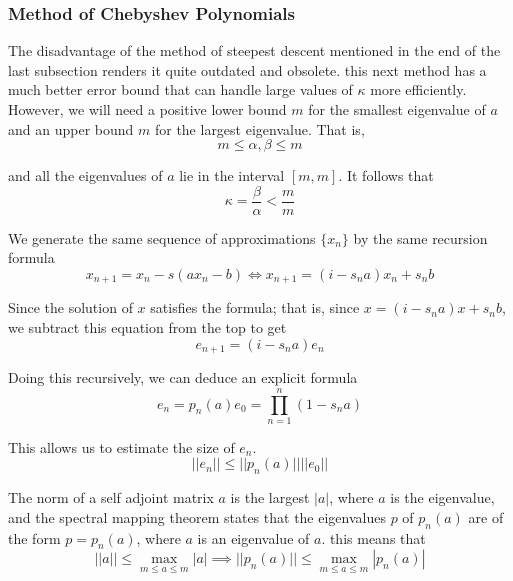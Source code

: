 \subsubsection{Method of Chebyshev Polynomials}

  The disadvantage of the method of steepest descent mentioned in the end of the last subsection renders it quite outdated and obsolete. this next method has a much better error bound that can handle large values of $\kappa$ more efficiently. However, we will need a positive lower bound $m$ for the smallest eigenvalue of $a$ and an upper bound $m$ for the largest eigenvalue. That is, 
  \begin{equation}
    m \leq \alpha, \beta \leq m
  \end{equation}

  and all the eigenvalues of $a$ lie in the interval $[m, m]$. It follows that
  \begin{equation}
    \kappa = \frac{\beta}{\alpha} < \frac{m}{m}
  \end{equation}

  We generate the same sequence of approximations $\{x_n\}$ by the same recursion formula
  \begin{equation}
    x_{n+1} = x_n - s(a x_n - b) \iff x_{n+1} = (i - s_n a) x_n + s_n b
  \end{equation}

  Since the solution of $x$ satisfies the formula; that is, since $x = (i - s_n a) x + s_n b$, we subtract this equation from the top to get
  \begin{equation}
    e_{n+1} = (i - s_n a) e_n
  \end{equation}

  Doing this recursively, we can deduce an explicit formula 
  \begin{equation}
    e_n = p_n (a) e_0 = \prod_{n=1}^n (1 - s_n a)
  \end{equation}

  This allows us to estimate the size of $e_n$. 
  \begin{equation}
    ||e_n|| \leq ||p_n (a)|| ||e_0||
  \end{equation}

  The norm of a self adjoint matrix $a$ is the largest $|a|$, where $a$ is the eigenvalue, and the spectral mapping theorem states that the eigenvalues $p$ of $p_n (a)$ are of the form $p = p_n (a)$, where $a$ is an eigenvalue of $a$. this means that
  \begin{equation}
    ||a|| \leq \max_{m \leq a \leq m} |a| \implies ||p_n (a)|| \leq \max_{m \leq a \leq m} |p_n (a)|
  \end{equation}

